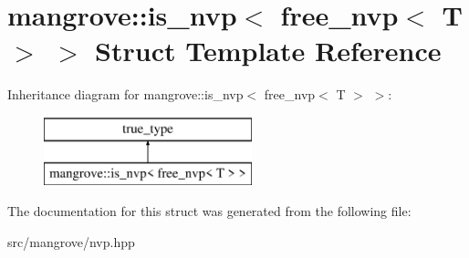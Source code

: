 \hypertarget{structmangrove_1_1is__nvp_3_01free__nvp_3_01T_01_4_01_4}{}\section{mangrove\+:\+:is\+\_\+nvp$<$ free\+\_\+nvp$<$ T $>$ $>$ Struct Template Reference}
\label{structmangrove_1_1is__nvp_3_01free__nvp_3_01T_01_4_01_4}
Inheritance diagram for mangrove\+:\+:is\+\_\+nvp$<$ free\+\_\+nvp$<$ T $>$ $>$\+:\begin{figure}[H]
\begin{center}
\leavevmode
\includegraphics[height=2.000000cm]{structmangrove_1_1is__nvp_3_01free__nvp_3_01T_01_4_01_4}
\end{center}
\end{figure}


The documentation for this struct was generated from the following file\+:\begin{DoxyCompactItemize}
\item 
src/mangrove/nvp.\+hpp\end{DoxyCompactItemize}
